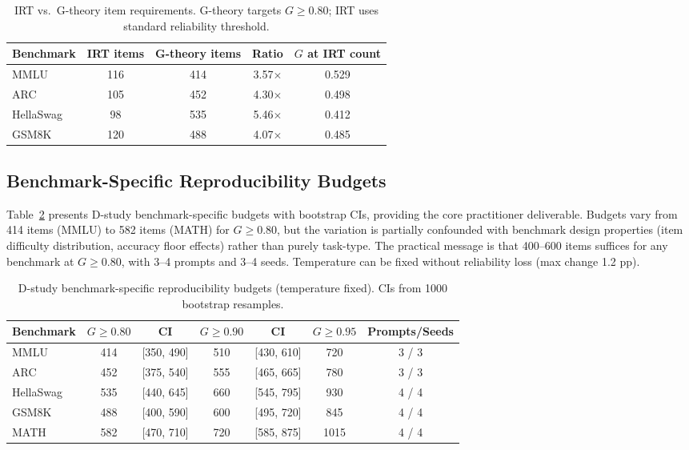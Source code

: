 \documentclass[11pt]{article}
\begin{document}
\begin{table}[t]
\centering
\caption{IRT vs.\ G-theory item requirements. G-theory targets $G \geq 0.80$; IRT uses standard reliability threshold.}
\label{tab:irt_gtheory}
\small
\begin{tabular}{@{}lcccc@{}}
\toprule
Benchmark & IRT items & G-theory items & Ratio & $G$ at IRT count \\
\midrule
MMLU      & 116 & 414 & 3.57$\times$ & 0.529 \\
ARC       & 105 & 452 & 4.30$\times$ & 0.498 \\
HellaSwag &  98 & 535 & 5.46$\times$ & 0.412 \\
GSM8K     & 120 & 488 & 4.07$\times$ & 0.485 \\
\bottomrule
\end{tabular}
\end{table}

\subsection{Benchmark-Specific Reproducibility Budgets}

Table~\ref{tab:dstudy_budgets} presents D-study benchmark-specific budgets with bootstrap CIs, providing the core practitioner deliverable.
Budgets vary from 414 items (MMLU) to 582 items (MATH) for $G \geq 0.80$, but the variation is partially confounded with benchmark design properties (item difficulty distribution, accuracy floor effects) rather than purely task-type.
The practical message is that 400--600 items suffices for any benchmark at $G \geq 0.80$, with 3--4 prompts and 3--4 seeds.
Temperature can be fixed without reliability loss (max change 1.2 pp).

\begin{table}[t]
\centering
\caption{D-study benchmark-specific reproducibility budgets (temperature fixed). CIs from 1000 bootstrap resamples.}
\label{tab:dstudy_budgets}
\small
\begin{tabular}{@{}lcccccc@{}}
\toprule
Benchmark & $G{\geq}0.80$ & CI & $G{\geq}0.90$ & CI & $G{\geq}0.95$ & Prompts/Seeds \\
\midrule
MMLU      & 414 & [350, 490] & 510 & [430, 610] & 720 & 3 / 3 \\
ARC       & 452 & [375, 540] & 555 & [465, 665] & 780 & 3 / 3 \\
HellaSwag & 535 & [440, 645] & 660 & [545, 795] & 930 & 4 / 4 \\
GSM8K     & 488 & [400, 590] & 600 & [495, 720] & 845 & 4 / 4 \\
MATH      & 582 & [470, 710] & 720 & [585, 875] & 1015 & 4 / 4 \\
\bottomrule
\end{tabular}
\end{table}
\end{document}

